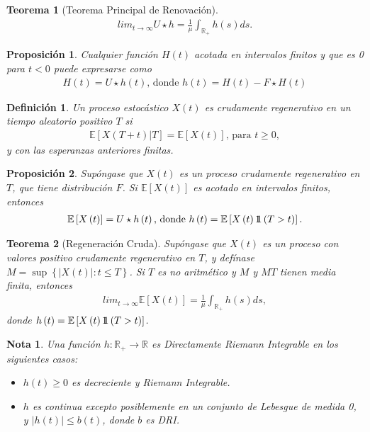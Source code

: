 \documentclass{article}
\newtheorem{Def}{Definición}[section]
\newtheorem{Teo}{Teorema}[section]
\newtheorem{Note}{Nota}[section]
\newtheorem{Prop}{Proposición}[section]
\newcommand{\rea}{\mathbb{R}}
\newcommand{\esp}{\mathbb{E}}
\newcommand{\indora}{\mbox{$1$\hspace{-0.8ex}$1$}}
\numberwithin{equation}{section}
\begin{document}
{\begin{Teo}[Teorema Principal de Renovaci\'on]
\begin{eqnarray*}
lim_{t\rightarrow\infty}U\star h=\frac{1}{\mu}\int_{\rea_{+}}h\left(s\right)ds.
\end{eqnarray*}
\end{Teo}

\begin{Prop}
Cualquier funci\'on $H\left(t\right)$ acotada en intervalos finitos y que es 0 para $t<0$ puede expresarse como
\begin{eqnarray*}
H\left(t\right)=U\star h\left(t\right)\textrm{,  donde }h\left(t\right)=H\left(t\right)-F\star H\left(t\right)
\end{eqnarray*}
\end{Prop}

\begin{Def}
Un proceso estoc\'astico $X\left(t\right)$ es crudamente regenerativo en un tiempo aleatorio positivo $T$ si
\begin{eqnarray*}
\esp\left[X\left(T+t\right)|T\right]=\esp\left[X\left(t\right)\right]\textrm{, para }t\geq0,\end{eqnarray*}
y con las esperanzas anteriores finitas.
\end{Def}

\begin{Prop}
Sup\'ongase que $X\left(t\right)$ es un proceso crudamente regenerativo en $T$, que tiene distribuci\'on $F$. Si $\esp\left[X\left(t\right)\right]$ es acotado en intervalos finitos, entonces
\begin{eqnarray*}
\esp\left[X\left(t\right)\right]=U\star h\left(t\right)\textrm{,  donde }h\left(t\right)=\esp\left[X\left(t\right)\indora\left(T>t\right)\right].
\end{eqnarray*}
\end{Prop}

\begin{Teo}[Regeneraci\'on Cruda]
Sup\'ongase que $X\left(t\right)$ es un proceso con valores positivo crudamente regenerativo en $T$, y def\'inase $M=\sup\left\{|X\left(t\right)|:t\leq T\right\}$. Si $T$ es no aritm\'etico y $M$ y $MT$ tienen media finita, entonces
\begin{eqnarray*}
lim_{t\rightarrow\infty}\esp\left[X\left(t\right)\right]=\frac{1}{\mu}\int_{\rea_{+}}h\left(s\right)ds,
\end{eqnarray*}
donde $h\left(t\right)=\esp\left[X\left(t\right)\indora\left(T>t\right)\right]$.
\end{Teo}


\begin{Note} Una funci\'on $h:\rea_{+}\rightarrow\rea$ es Directamente Riemann Integrable en los siguientes casos:
\begin{itemize}
\item[a)] $h\left(t\right)\geq0$ es decreciente y Riemann Integrable.
\item[b)] $h$ es continua excepto posiblemente en un conjunto de Lebesgue de medida 0, y $|h\left(t\right)|\leq b\left(t\right)$, donde $b$ es DRI.
\end{itemize}
\end{Note}

}
\end{document}
